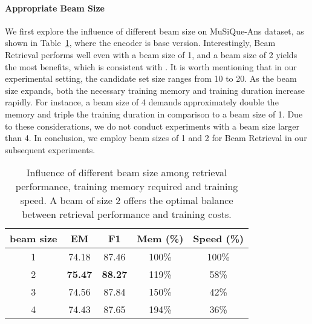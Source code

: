 \documentclass[10.5pt]{article}
\begin{document}
\paragraph{Appropriate Beam Size}
We first explore the influence of different beam size on MuSiQue-Ans dataset, as shown in Table~\ref{tab:beam_size}, where the encoder is base version. Interestingly, Beam Retrieval performs well even with a beam size of 1, and a beam size of 2 yields the most benefits, which is consistent with \cite{seq2seq_learning_with_nn}. It is worth mentioning that in our experimental setting, the candidate set size  ranges from 10 to 20. As the beam size expands, both the necessary training memory and training duration increase rapidly. For instance, a beam size of 4 demands approximately double the memory and triple the training duration in comparison to a beam size of 1. Due to these considerations, we do not conduct experiments with a beam size larger than 4. In conclusion, we employ beam sizes of 1 and 2 for Beam Retrieval in our subsequent experiments.
\begin{table}[htb]
\centering
\begin{tabular}{ccccc}
\hline
beam size & \textbf{EM}    & \textbf{F1}    & \textbf{Mem} (\%)    & \textbf{Speed} (\%) \\
\hline
1         & 74.18 & 87.46 & 100\% & 100\% \\
2         & \textbf{75.47} & \textbf{88.27} & 119\% & 58\% \\
3         & 74.56 & 87.84 & 150\%   & 42\% \\
4         & 74.43 & 87.65 & 194\%   & 36\% \\
\hline
\end{tabular}
\caption{Influence of different beam size among retrieval performance, training memory required and training speed. A beam of size 2 offers the optimal balance between retrieval performance and training costs.}
\label{tab:beam_size}
\end{table}
\end{document}
